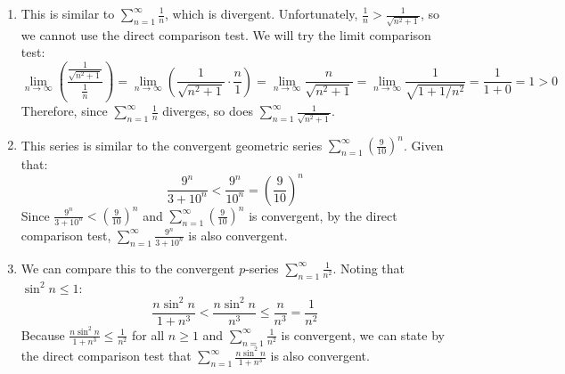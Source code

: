 \begin{Answer}[ref = comp1]
\begin{enumerate}
\item This is similar to $\sum_{n=1}^\infty \frac{1}{n}$, which is divergent. 
Unfortunately, $\frac{1}{n} > \frac{1}{\sqrt{n^2 + 1}}$, so we cannot use the 
direct comparison test. We will try the limit comparison test:
$$\lim_{n \to \infty} \left( \frac{\frac{1}{\sqrt{n^2 + 1}}}{\frac{1}{n}} 
\right) = \lim_{n \to \infty} \left( \frac{1}{\sqrt{n^2 + 1}} \cdot \frac{n}{1} 
\right) = \lim_{n \to \infty} \frac{n}{\sqrt{n^2 + 1}} = \lim_{n \to \infty} 
\frac{1}{\sqrt{1 + 1/n^2}} = \frac{1}{1+ 0} = 1 > 0$$
Therefore, since $\sum_{n=1}^\infty \frac{1}{n}$ diverges, so does $\sum_
{n=1}^\infty \frac{1}{\sqrt{n^2 + 1}}$.
\item This series is similar to the convergent geometric series $\sum_{n=1}^
\infty \left( \frac{9}{10} \right)^n$. Given that:
$$\frac{9^n}{3 + 10^n} < \frac{9^n}{10^n} = \left( \frac{9}{10} \right)^n$$
Since $\frac{9^n}{3 + 10^n} < \left( \frac{9}{10} \right)^n$ and $\sum_{n=1}
^\infty \left( \frac{9}{10} \right)^n$ is convergent, by the direct comparison 
test, $\sum_{n=1}^\infty \frac{9^n}{3 + 10^n}$ is also convergent. 
\item We can compare this to the convergent $p$-series $\sum_{n=1}^\infty 
\frac{1}{n^2}$. Noting that $\sin^2{n} \leq 1$:
$$\frac{n \sin^2{n}}{1 + n^3} < \frac{n \sin^2{n}}{n^3} \leq \frac{n}{n^3} = 
\frac{1}{n^2}$$
Because $\frac{n \sin^2{n}}{1 + n^3} \leq \frac{1}{n^2}$ for all $n \geq 1$ 
and $\sum_{n=1}^\infty \frac{1}{n^2}$ is convergent, we can state by the 
direct comparison test that $\sum_{n=1}^\infty \frac{n \sin^2{n}}{1 + n^3}$ 
is also convergent. 
\end{enumerate}
\end{Answer}
